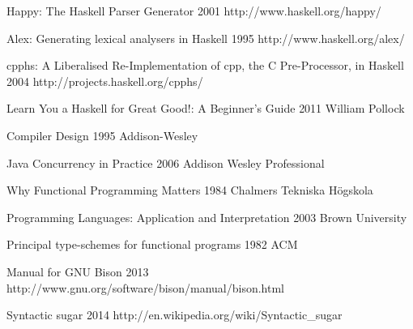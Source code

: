 
\begingroup
\renewcommand{\section}[2]{}%

\begin{thebibliography}{99}

  {Happy: The Haskell Parser Generator}
  {2001}
  {http://www.haskell.org/happy/}

  {Alex: Generating lexical analysers in Haskell}
  {1995}
  {http://www.haskell.org/alex/}

  {cpphs: A Liberalised Re-Implementation of cpp, the C Pre-Processor, in Haskell}
  {2004}
  {http://projects.haskell.org/cpphs/}

  {Learn You a Haskell for Great Good!: A Beginner's Guide}
  {2011}
  {William Pollock}

  {Compiler Design}
  {1995}
  {Addison-Wesley}

  {Java Concurrency in Practice}
  {2006}
  {Addison Wesley Professional}

  {Why Functional Programming Matters}
  {1984}
  {Chalmers Tekniska Högskola}

  {Programming Languages: Application and Interpretation}
  {2003}
  {Brown University}

  {Principal type-schemes for functional programs}
  {1982}
  {ACM}

  {Manual for GNU Bison }
  {2013}
  {http://www.gnu.org/software/bison/manual/bison.html}

  {Syntactic sugar}
  {2014}
  {http://en.wikipedia.org/wiki/Syntactic_sugar}


\end{thebibliography}

\endgroup